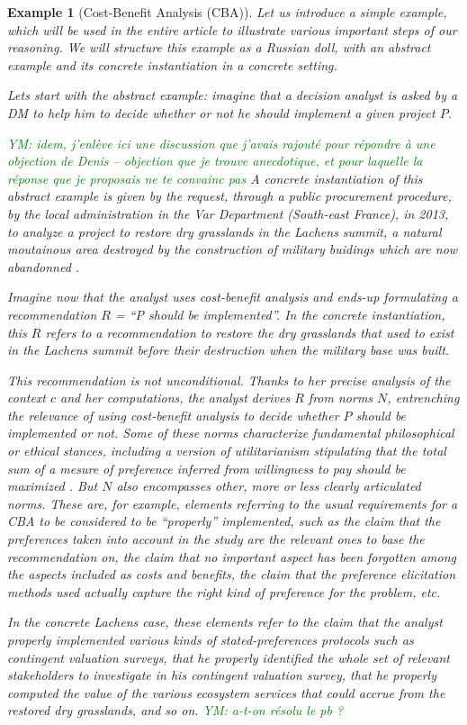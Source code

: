 \documentclass[preprint, french, english, 11pt, authoryear]{elsarticle}%
\newtheorem{example}{Example}
\newcommand{\commentYM}[1]{\textcolor{green}{YM: #1}}
\begin{document}
\begin{example}[Cost-Benefit Analysis (CBA)]
Let us introduce a simple example, which will be used in the entire article to illustrate various important steps of our reasoning. We will structure this example as a Russian doll, with an abstract example and its concrete instantiation in a concrete setting. 

Lets start with the abstract example: imagine that a decision analyst is asked by a \ac{DM} to help him to decide whether or not he should implement a given project $P$.

\commentYM{idem, j'enlève ici une discussion que j'avais rajouté pour répondre à une objection de Denis -- objection que je trouve anecdotique, et pour laquelle la réponse que je proposais ne te convainc pas}
A concrete instantiation of this abstract example is given by the request, through a public procurement procedure, by the local administration in the Var Department (South-east France), in 2013, to analyze a project to restore dry grasslands in the Lachens summit, a natural moutainous area destroyed by the construction of military buidings which are now abandonned \citep{meinard_etude_2015}.

Imagine now that the analyst uses cost-benefit analysis \citep{layard_cost-benefit_1994} and ends-up formulating a recommendation $R$ = “P should be implemented”. In the concrete instantiation, this $R$ refers to a recommendation to restore the dry grasslands that used to exist in the Lachens summit before their destruction when the military base was built. 

This recommendation is not unconditional. Thanks to her precise analysis of the context $c$ and her computations, the analyst derives $R$ from norms $N$, entrenching the relevance of using cost-benefit analysis to decide whether $P$ should be implemented or not. Some of these norms characterize fundamental philosophical or ethical stances, including a version of utilitarianism stipulating that the total sum of a mesure of preference inferred from willingness to pay should be maximized  \citep{meinard_ethical_2016}. 
But $N$ also encompasses other, more or less clearly articulated norms. These are, for example, elements referring to the usual requirements for a CBA to be considered to be ``properly'' implemented, such as the claim that the preferences taken into account in the study are the relevant ones to base the recommendation on, the claim that no important aspect has been forgotten among the aspects included as costs and benefits, the claim that the preference elicitation methods used actually capture the right kind of preference for the problem, etc.

In the concrete Lachens case, these elements refer to the claim that the analyst properly implemented various kinds of stated-preferences protocols such as contingent valuation surveys, that he properly identified the whole set of relevant stakeholders to investigate in his contingent valuation survey, that he properly computed the value of the various ecosystem services that could accrue from the restored dry grasslands, and so on.
\commentYM{a-t-on résolu le pb ?}
\end{example}
\end{document}

